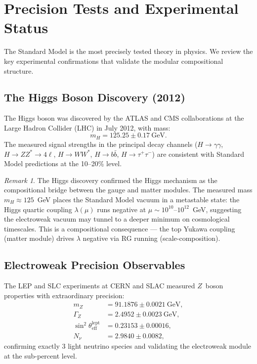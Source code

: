 \documentclass[12pt]{article}
\theoremstyle{definition}
\theoremstyle{remark}
\newtheorem{remark}[theorem]{Remark}
\begin{document}
\section{Precision Tests and Experimental Status}
\label{sec:precision}

The Standard Model is the most precisely tested theory in physics. We review the key experimental confirmations that validate the modular compositional structure.

\subsection{The Higgs Boson Discovery (2012)}

The Higgs boson was discovered by the ATLAS and CMS collaborations at the Large Hadron Collider (LHC) in July 2012, with mass:
\begin{equation}
m_H = 125.25 \pm 0.17~\text{GeV}.
\end{equation}
The measured signal strengths in the principal decay channels ($H \to \gamma\gamma$, $H \to ZZ^* \to 4\ell$, $H \to WW^*$, $H \to b\bar{b}$, $H \to \tau^+\tau^-$) are consistent with Standard Model predictions at the 10--20\% level.

\begin{remark}
The Higgs discovery confirmed the Higgs mechanism as the compositional bridge between the gauge and matter modules. The measured mass $m_H \approx 125$~GeV places the Standard Model vacuum in a metastable state: the Higgs quartic coupling $\lambda(\mu)$ runs negative at $\mu \sim 10^{10}$--$10^{12}$~GeV, suggesting the electroweak vacuum may tunnel to a deeper minimum on cosmological timescales. This is a compositional consequence --- the top Yukawa coupling (matter module) drives $\lambda$ negative via RG running (scale-composition).
\end{remark}

\subsection{Electroweak Precision Observables}

The LEP and SLC experiments at CERN and SLAC measured $Z$~boson properties with extraordinary precision:
\begin{align}
m_Z &= 91.1876 \pm 0.0021~\text{GeV}, \\
\Gamma_Z &= 2.4952 \pm 0.0023~\text{GeV}, \\
\sin^2\theta_{\mathrm{eff}}^{\mathrm{lept}} &= 0.23153 \pm 0.00016, \\
N_\nu &= 2.9840 \pm 0.0082,
\end{align}
confirming exactly 3 light neutrino species and validating the electroweak module at the sub-percent level.
\end{document}
